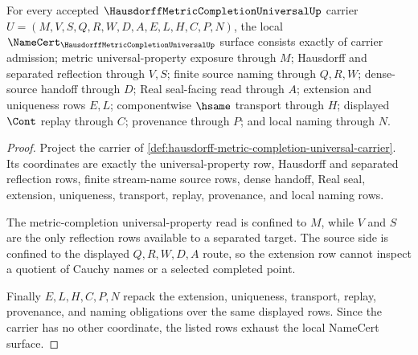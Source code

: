 \begin{theorem}
\label{thm:hausdorff-metric-completion-universal-namecert-obligations}
For every accepted $\HausdorffMetricCompletionUniversalUp$ carrier $U=(M,V,S,Q,R,W,D,A,E,L,H,C,P,N)$, the local $\NameCert_{\HausdorffMetricCompletionUniversalUp}$ surface consists exactly of carrier admission; metric universal-property exposure through $M$; Hausdorff and separated reflection through $V,S$; finite source naming through $Q,R,W$; dense-source handoff through $D$; Real seal-facing read through $A$; extension and uniqueness rows $E,L$; componentwise $\hsame$ transport through $H$; displayed $\Cont$ replay through $C$; provenance through $P$; and local naming through $N$.
\end{theorem}
\begin{proof}
Project the carrier of \autoref{def:hausdorff-metric-completion-universal-carrier}. Its coordinates are exactly the universal-property row, Hausdorff and separated reflection rows, finite stream-name source rows, dense handoff, Real seal, extension, uniqueness, transport, replay, provenance, and local naming rows.

The metric-completion universal-property read is confined to $M$, while $V$ and $S$ are the only reflection rows available to a separated target. The source side is confined to the displayed $Q,R,W,D,A$ route, so the extension row cannot inspect a quotient of Cauchy names or a selected completed point.

Finally $E,L,H,C,P,N$ repack the extension, uniqueness, transport, replay, provenance, and naming obligations over the same displayed rows. Since the carrier has no other coordinate, the listed rows exhaust the local NameCert surface.
\end{proof}


